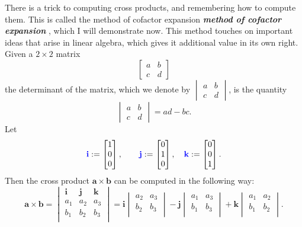 \documentclass[10pt]{article}
\DeclareRobustCommand{\demph}[1]{%
  \ifmmode
  {\color{Blue}#1}%
  \else
  {\color{Blue}\bfseries\slshape #1}%
  \fi
}
\theoremstyle{definition}
\newcommand{\1}[1]{\textbf{1}_{\left[#1\right]}} %
\begin{document}
There is a trick to computing cross products, and remembering how to compute
them. This is called the \demph{method of cofactor expansion}, which I will
demonstrate now. This method touches on important ideas that arise in linear
algebra, which gives it additional value in its own right. Given a $2\times 2$ matrix
\begin{equation*}
  \begin{bmatrix}
    a&b\\
    c&d
  \end{bmatrix}
\end{equation*}
the determinant of the matrix, which we denote by  $\begin{vmatrix} a&b\\c&d \end{vmatrix}$, is the quantity
\begin{equation*}
  \begin{vmatrix}
    a&b\\
    c&d
  \end{vmatrix}
  = ad-bc.
\end{equation*}
Let
\begin{equation*}
  \demph{\mathbf{i}} :=
  \begin{bmatrix}
    1\\0\\0
  \end{bmatrix},
  \qquad
  \demph{\mathbf{j}} :=
  \begin{bmatrix}
    0\\1\\0
  \end{bmatrix},
  \quad
  \demph{\mathbf{k}} :=
  \begin{bmatrix}
    0\\0\\1
  \end{bmatrix}.
\end{equation*}
Then the cross product $\mathbf{a}\times \mathbf{b}$ can be computed in the
following way:
\begin{equation*}
  \mathbf{a}\times \mathbf{b}
  =
  \begin{vmatrix}
    \mathbf{i}&\mathbf{j}&\mathbf{k}\\
    a_{1}&a_{2}&a_{3}\\
    b_{1}&b_{2}&b_{3}\\
  \end{vmatrix}
  =
  \mathbf{i}
  \begin{vmatrix}
    a_{2}&a_{3}\\
    b_{2}&b_{3}\\
  \end{vmatrix}
  -
  \mathbf{j}
  \begin{vmatrix}
    a_{1}&a_{3}\\
    b_{1}&b_{3}\\
  \end{vmatrix}
  +
  \mathbf{k}
  \begin{vmatrix}
    a_{1}&a_{2}\\
    b_{1}&b_{2}\\
  \end{vmatrix}.
\end{equation*}
\end{document}

